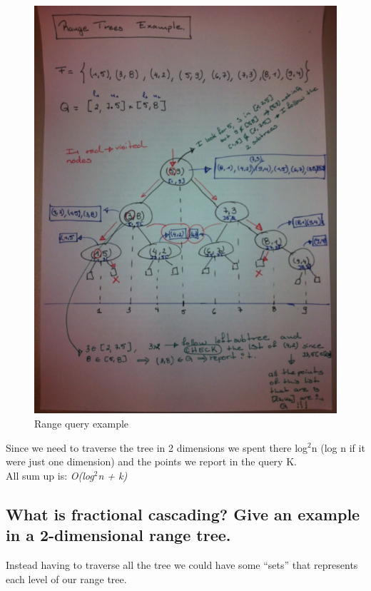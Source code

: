 \documentclass{article}
\begin{document}
\begin{figure}[H]
  \begin{center}
    \includegraphics[width=\textwidth]{imgs/range_trees_example.png}
    \caption{Range query example}
    \label{fig:range_query_example}
  \end{center}
\end{figure}

Since we need to traverse the tree in 2 dimensions we spent there log$^2$n (log n if it were just one dimension) and the points we report in the query K.\\
All sum up is: \textit{O(log$^2$n + k)}


\subsection{What is fractional cascading? Give an example in a 2-dimensional range
tree.}

Instead having to traverse all the tree we could have some “sets” that represents each level of our range tree.
\end{document}
